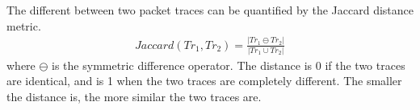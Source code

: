 The different between two packet traces can be quantified by the Jaccard distance
metric.%
\begin{align}
  Jaccard(Tr_1, Tr_2) = \frac{\left\vert Tr_1 \ominus Tr_2\right\vert}{\left\vert
  Tr_1 \cup Tr_2\right\vert}
\end{align}%
where $\ominus$ is the symmetric difference operator.
The distance is 0 if the
two traces are identical, and is 1 when the two traces are completely different.
The smaller the distance is, the more similar the two traces are.

